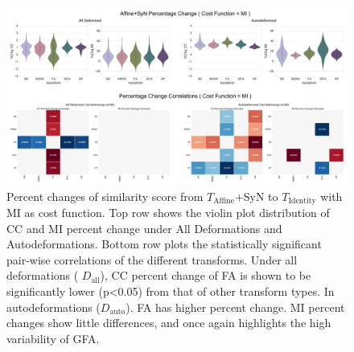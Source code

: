 \begin{figure}[H]
\includegraphics[width=\linewidth]{sup2}
\caption{Percent changes of similarity score from \protect $T_{\text{Affine}}$+SyN to \protect $T_{\text{Identity}}$ with MI as cost function. Top row shows the violin plot distribution of CC and MI percent change under All Deformations and Autodeformations. Bottom row plots the statistically significant pair-wise correlations of the different transforms.
Under all deformations ( \protect$D_{\text{all}}$), CC percent change of FA is shown to be significantly lower (p<0.05) from that of other transform types. In autodeformations (\protect$D_{\text{auto}}$). FA has higher percent change. MI percent changes show little differences, and once again highlights the high variability of GFA. }
\centering
\label{fig:APfigure8}
\end{figure}